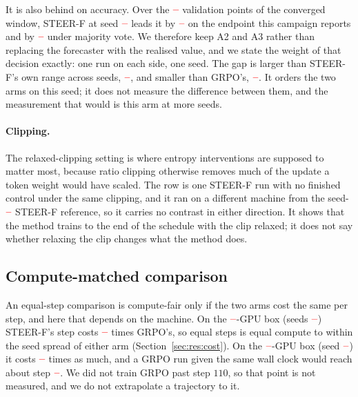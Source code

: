 \documentclass[11pt]{article}
\providecommand{\PENDING}{\textcolor{red}{\textbf{--}}}
\newcommand{\num}[1]{\ifcsname #1\endcsname\csname #1\endcsname\else\PENDING\fi}
\begin{document}
It is also behind on accuracy. Over the
$\num{Fnsignedoracle}$ validation points of the converged window, STEER-F at seed
$\num{Roracleseed}$ leads it by $\num{Fsignedoracleacc}$ on the endpoint this
campaign reports and by $\num{Fsignedoraclemaj}$ under majority vote. We therefore
keep A2 and A3 rather than replacing the forecaster with the realised value, and we
state the weight of that decision exactly: one run on each side, one seed. The gap is
larger than STEER-F's own range across seeds, $\num{Ssignedacc}$, and smaller than
GRPO's, $\num{Sgrpoacc}$. It orders the two arms on this seed; it does not measure
the difference between them, and the measurement that would is this arm at more
seeds.

\paragraph{Clipping.} The relaxed-clipping setting is where entropy interventions
are supposed to matter most, because ratio clipping otherwise removes much of the
update a token weight would have scaled. The row is one STEER-F run with no
finished control under the same clipping, and it ran on a different machine from the
seed-$\num{Rxclipsignedseed}$ STEER-F reference, so it carries no contrast in either
direction. It shows that the method trains to the end of the schedule with the clip
relaxed; it does not say whether relaxing the clip changes what the method does.

\subsection{Compute-matched comparison}
\label{sec:res:compute}

An equal-step comparison is compute-fair only if the two arms cost the same per
step, and here that depends on the machine. On the $\num{Costgpushi}$-GPU box
(seeds $\num{Cmhiseeds}$) STEER-F's step costs $\num{Cmhiratio}$ times GRPO's,
so equal steps is equal compute to within the seed spread of either arm
(Section~\ref{sec:res:cost}). On the $\num{Costgpuslo}$-GPU box (seed
$\num{Cmloseeds}$) it costs $\num{Cmloratio}$ times as much, and a GRPO run given
the same wall clock would reach about step $\num{Cmlostep}$. We did not train GRPO
past step $110$, so that point is not measured, and we do not extrapolate a
trajectory to it.
\end{document}
